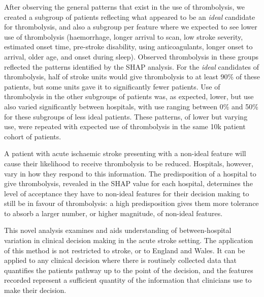 After observing the general patterns that exist in the use of thrombolysis, we created a subgroup of patients reflecting what appeared to be an \emph{ideal} candidate for thrombolysis, and also a subgroup per feature where we expected to see lower use of thrombolysis (haemorrhage, longer arrival to scan, low stroke severity, estimated onset time, pre-stroke disability, using anticoagulants, longer onset to arrival, older age, and onset during sleep). Observed thrombolysis in these groups reflected the patterns identified by the SHAP analysis. For the \emph{ideal} candidates of thrombolysis, half of stroke units would give thrombolysis to at least 90\% of these patients, but some units gave it to significantly fewer patients. Use of thrombolysis in the other subgroups of patients was, as expected, lower, but use also varied significantly between hospitals, with use ranging between 0\% and 50\% for these subgroups of less ideal patients. These patterns, of lower but varying use, were repeated with expected use of thrombolysis in the same 10k patient cohort of patients.

A patient with acute ischaemic stroke presenting with a non-ideal feature will cause their likelihood to receive thrombolysis to be reduced. Hospitals, however, vary in how they respond to this information. The predisposition of a hospital to give thrombolysis, revealed in the SHAP value for each hospital, determines the level of acceptance they have to non-ideal features for their decision making to still be in favour of thrombolysis: a high predisposition gives them more tolerance to absorb a larger number, or higher magnitude, of non-ideal features.

\iffalse
REFERS TO ARTIFICIAL PATIENTS THAT MAY NOT INCLUDE
Another way of showing variation between units was to use artificial patients. After observing the general patterns that exist in the use of thrombolysis, we created an artificial patient representing an \emph{ideal} candidate for thrombolysis that was predicted to receive thrombolysis at almost every hospital. But when we reduced their stroke severity and attributed an estimated onset time the predicted use of thrombolysis dropped to 35\% of hospitals. With the use of SHAP values it is possible to take the next step into understanding this result by peering into how each hospital responds to the characteristics of this patient, to elucidate where hospitals vary in their attitudes to thrombolysis.
\fi

This novel analysis examines and aids understanding of between-hospital variation in clinical decision making in the acute stroke setting. The application of this method is not restricted to stroke, or to England and Wales. It can be applied to any clinical decision where there is routinely collected data that quantifies the patients pathway up to the point of the decision, and the features recorded represent a sufficient quantity of the information that clinicians use to make their decision.

